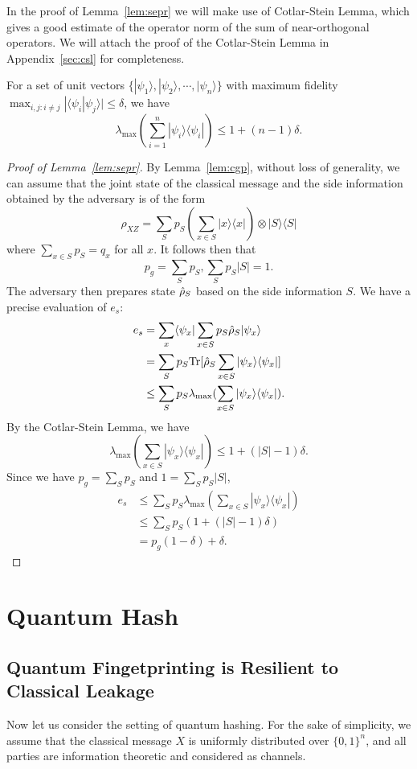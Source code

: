 In the proof of Lemma~\ref{lem:sepr} we will make use of Cotlar-Stein Lemma, which gives a good estimate of the operator norm of the sum of near-orthogonal operators. We will attach the proof of the Cotlar-Stein Lemma in Appendix~\ref{sec:csl} for completeness.

\begin{lemma}
\label{lem:csl}
For a set of unit vectors $\{|\psi_1\rangle,|\psi_2\rangle,\cdots,|\psi_n\rangle\}$ with maximum fidelity $\max_{i,j:i\neq j}|\langle \psi_i|\psi_j\rangle|\leq \delta$, we have
$$\lambda_{\max}\left(\sum_{i=1}^n|\psi_i\rangle\langle \psi_i|\right)\leq 1+(n-1)\delta.$$
\end{lemma}
\begin{proof}[Proof of Lemma~\ref{lem:sepr}]
By Lemma~\ref{lem:cgp}, without loss of generality, we can assume that the joint state of the classical message and the side information obtained by the adversary is of the form
$$\rho_{XZ}=\sum_{S}p_S(\sum_{x\in S}|x\rangle\langle x|)\otimes |S\rangle\langle S|$$
where $\sum_{x\in S}p_S=q_x$ for all $x$. It follows then that $$p_g=\sum_Sp_S, \sum_{S}p_S|S|=1.$$ The adversary then prepares state $\hat{\rho}_S$ based on the side information $S$. We have a precise evaluation of $e_s$:
\begin{align*}
e_s&=\sum_x \langle \psi_x|\sum_{x\in S}p_S\hat{\rho}_S|\psi_x\rangle \\
&=\sum_S p_S\textnormal{Tr}[\hat{\rho}_S \sum_{x\in S}|\psi_x\rangle\langle \psi_x|]\\
&\leq \sum_S p_S\lambda_{\max} (\sum_{x\in S}|\psi_x\rangle\langle \psi_x|).\\
\end{align*}
By the Cotlar-Stein Lemma, we have
$$\lambda_{\max}(\sum_{x\in S}|\psi_x\rangle\langle \psi_x|)\leq 1+(|S|-1)\delta.$$
Since we have $p_g=\sum_Sp_S$ and $1=\sum_Sp_S|S|$, 
\begin{align*}
e_s&\leq \sum_Sp_S\lambda_{\max}\left(\sum_{x\in S}|\psi_x\rangle\langle\psi_x|\right)\\
&\leq \sum_Sp_S\left(1+(|S|-1)\delta\right)\\
&=p_g(1-\delta)+\delta.\end{align*}
\end{proof}

\section{Quantum Hash}
\subsection{Quantum Fingetprinting is Resilient to Classical Leakage}
Now let us consider the setting of quantum hashing. For the sake of simplicity, we assume that the classical message $X$ is uniformly distributed over $\{0,1\}^n$, and all parties are information theoretic and considered as channels.

